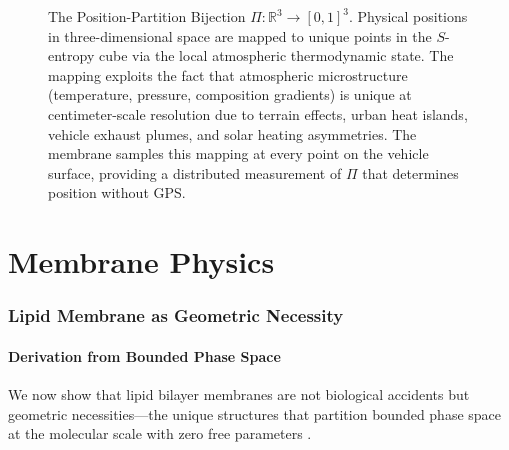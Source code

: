 \documentclass[12pt]{article}
\theoremstyle{definition}
\theoremstyle{remark}
\begin{document}
\begin{figure}[H]
\centering
{}
\caption{The Position-Partition Bijection $\Pi: \mathbb{R}^3 \to [0,1]^3$. Physical positions in three-dimensional space are mapped to unique points in the $S$-entropy cube via the local atmospheric thermodynamic state. The mapping exploits the fact that atmospheric microstructure (temperature, pressure, composition gradients) is unique at centimeter-scale resolution due to terrain effects, urban heat islands, vehicle exhaust plumes, and solar heating asymmetries. The membrane samples this mapping at every point on the vehicle surface, providing a distributed measurement of $\Pi$ that determines position without GPS.}
\label{fig:position_partition}
\end{figure}


\part{Membrane Physics}
\label{part:membrane_physics}

\section{Lipid Membrane as Geometric Necessity}
\label{sec:lipid_membrane}

\subsection{Derivation from Bounded Phase Space}

We now show that lipid bilayer membranes are not biological accidents but geometric necessities---the unique structures that partition bounded phase space at the molecular scale with zero free parameters \cite{sachikonye2026lipid}.
\end{document}
